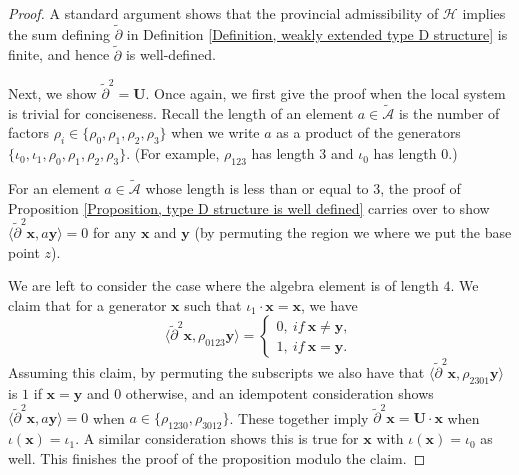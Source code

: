\documentclass[10pt,a4paper]{amsart}
\begin{document}
\begin{proof}
A standard argument shows that the provincial admissibility of $\mathcal{H}$ implies the sum defining $\tilde{\partial}$ in Definition \ref{Definition, weakly extended type D structure} is finite, and hence $\tilde{\partial}$ is well-defined. 

Next, we show $\tilde{\partial}^2=\bm{U}$. Once again, we first give the proof when the local system is trivial for conciseness. Recall the length of an element $a\in\tilde{\mathcal{A}}$ is the number of factors $\rho_i\in\{\rho_0,\rho_1,\rho_2,\rho_3\}$ when we write $a$ as a product of the generators $\{\iota_0,\iota_1,\rho_0,\rho_1,\rho_2,\rho_3\}$. (For example, $\rho_{123}$ has length $3$ and $\iota_0$ has length $0$.) 

For an element $a\in\tilde{\mathcal{A}}$ whose length is less than or equal to $3$, the proof of Proposition \ref{Proposition, type D structure is well defined} carries over to show $\langle \tilde{\partial}^2\bm{x}, a\bm{y}\rangle =0$ for any $\bm{x}$ and $\bm{y}$ (by permuting the region we where we put the base point $z$). 

We are left to consider the case where the algebra element is of length $4$. We claim that for a generator $\bm{x}$ such that $\iota_1\cdot \bm{x}=\bm{x}$, we have $$\langle\tilde{\partial}^2\bm{x}, \rho_{0123}\bm{y}\rangle=\begin{cases}0,\ if\  \bm{x}\neq\bm{y},\\1,\ if\ \bm{x}=\bm{y}.
\end{cases} $$
Assuming this claim, by permuting the subscripts we also have that $\langle\tilde{\partial}^2\bm{x}, \rho_{2301}\bm{y}\rangle$ is $1$ if $\bm{x}=\bm{y}$ and $0$ otherwise, and an idempotent consideration shows $\langle\tilde{\partial}^2\bm{x}, a\bm{y}\rangle=0$ when $a\in\{\rho_{1230},\rho_{3012}\}$. These together imply $\tilde{\partial}^2\bm{x}=\bm{U}\cdot \bm{x}$ when $\iota(\bm{x})=\iota_1$. A similar consideration shows this is true for $\bm{x}$ with $\iota(\bm{x})=\iota_0$ as well. This finishes the proof of the proposition modulo the claim. 


\end{proof}
\end{document}

